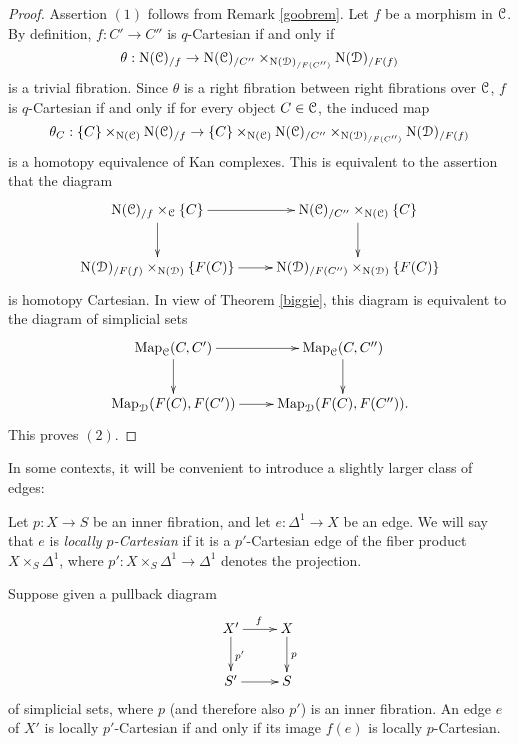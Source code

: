 \begin{proof}
Assertion $(1)$ follows from Remark \ref{goobrem}. Let $f$ be a morphism in $\operatorname{\mathcal{C}}$. By definition, $f: C' \rightarrow C''$ is $q$-Cartesian if and only if 
$$\theta: \operatorname{N}(\operatorname{\mathcal{C}})_{/f} \rightarrow \operatorname{N}(\operatorname{\mathcal{C}})_{/C''} \times_{ \operatorname{N}(\operatorname{\mathcal{D}})_{/F(C'')}} \operatorname{N}(\operatorname{\mathcal{D}})_{/F(f)}$$ is a trivial fibration. Since $\theta$ is a right fibration between
right fibrations over $\operatorname{\mathcal{C}}$, $f$ is $q$-Cartesian if and only if for every object $C \in \operatorname{\mathcal{C}}$, 
the induced map
$$\theta_{C}: \{C\} \times_{\operatorname{N}(\operatorname{\mathcal{C}})} \operatorname{N}(\operatorname{\mathcal{C}})_{/f} \rightarrow \{C\} \times_{\operatorname{N}(\operatorname{\mathcal{C}})} \operatorname{N}(\operatorname{\mathcal{C}})_{/C''} \times_{ \operatorname{N}(\operatorname{\mathcal{D}})_{/F(C'')}} \operatorname{N}(\operatorname{\mathcal{D}})_{/F(f)} $$
is a homotopy equivalence of Kan complexes. This is equivalent to the assertion that the diagram
$$ \xymatrix{ \sNerve(\calC)_{/f} \times_{\calC} \{C\} \ar[r] \ar[d] & \sNerve(\calC)_{/C''} \times_{\sNerve(\calC)} \{C\} \ar[d] \\
\sNerve(\calD)_{/F(f)} \times_{\sNerve(\calD)} \{F(C)\} \ar[r] & \sNerve(\calD)_{/F(C'')} \times_{ \sNerve(\calD)} \{ F(C) \} }$$
is homotopy Cartesian. In view of Theorem \ref{biggie}, this diagram is equivalent to the diagram of simplicial sets
$$ \xymatrix{ \bHom_{\calC}(C, C') \ar[r] \ar[d] & \bHom_{\calC}(C,C'') \ar[d] \\
\bHom_{\calD}(F(C), F(C')) \ar[r] & \bHom_{\calD}(F(C), F(C'')).}$$
This proves $(2)$.
\end{proof}

In some contexts, it will be convenient to introduce a slightly larger class of edges:

\begin{definition}
Let $p: X \rightarrow S$ be an inner fibration, and let $e: \Delta^1 \rightarrow X$ be an edge.
We will say that $e$ is {\it locally $p$-Cartesian} if it is a $p'$-Cartesian edge of the fiber product
$X \times_{S} \Delta^1$, where $p': X \times_{S} \Delta^1 \rightarrow \Delta^1$ denotes the projection.
\end{definition}

\begin{remark}\label{intin}
Suppose given a pullback diagram
$$ \xymatrix{ X' \ar[r]^{f} \ar[d]^{p'} & X \ar[d]^{p} \\
S' \ar[r] & S }$$
of simplicial sets, where $p$ (and therefore also $p'$) is an inner fibration. An edge
$e$ of $X'$ is locally $p'$-Cartesian if and only if its image $f(e)$ is locally $p$-Cartesian.
\end{remark}

